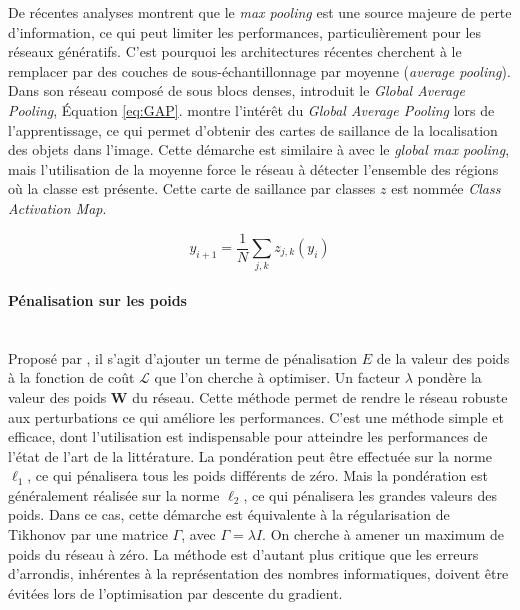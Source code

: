 De récentes analyses montrent que le \textit{max pooling} est une source majeure de perte d'information, ce qui peut limiter les performances, particulièrement pour les réseaux génératifs.
C'est pourquoi les architectures récentes cherchent à le remplacer par des couches de sous-échantillonnage par moyenne (\textit{average pooling}).
Dans son réseau composé de sous blocs denses, \cite{lin_network_2013} introduit le \textit{Global Average Pooling}, Équation \ref{eq:GAP}.
\cite{zhou_learning_2015} montre l'intérêt du \textit{Global Average Pooling} lors de l'apprentissage, ce qui permet d'obtenir des cartes de saillance de la localisation des objets dans l'image.
Cette démarche est similaire à \cite{oquab_object_2015} avec le \textit{global max pooling}, mais l'utilisation de la moyenne force le réseau à détecter l'ensemble des régions où la classe est présente.
Cette carte de saillance par classes $z$ est nommée \textit{Class Activation Map}.

\begin{equation} \label{eq:GAP}
y_{i+1} = \frac{1}{N} \sum_{j, k} z_{j, k}(y_i)
\end{equation}


\paragraph{Pénalisation sur les poids}\mbox{} \label{parag:weights_decay} \\
Proposé par \cite{krogh_simple_1991}, il s'agit d'ajouter un terme de pénalisation $E$ de la valeur des poids à la fonction de coût $\mathcal{L}$ que l'on cherche à optimiser.
Un facteur $\lambda$ pondère la valeur des poids $\mathbf{W}$ du réseau.
Cette méthode permet de rendre le réseau robuste aux perturbations ce qui améliore les performances.
C'est une méthode simple et efficace, dont l'utilisation est indispensable pour atteindre les performances de l'état de l'art de la littérature.
La pondération peut être effectuée sur la norme $\ell_{1}$, ce qui pénalisera tous les poids différents de zéro.
Mais la pondération est généralement réalisée sur la norme $\ell_{2}$, ce qui pénalisera les grandes valeurs des poids.
Dans ce cas, cette démarche est équivalente à la régularisation de Tikhonov \cite{tikhonov_stability_1943, tikhonov_solutions_1977} par une matrice $\Gamma$, avec $\Gamma=\lambda I$.
On cherche à amener un maximum de poids du réseau à zéro.
La méthode est d'autant plus critique que les erreurs d'arrondis, inhérentes à la représentation des nombres informatiques, doivent être évitées lors de l'optimisation par descente du gradient.

